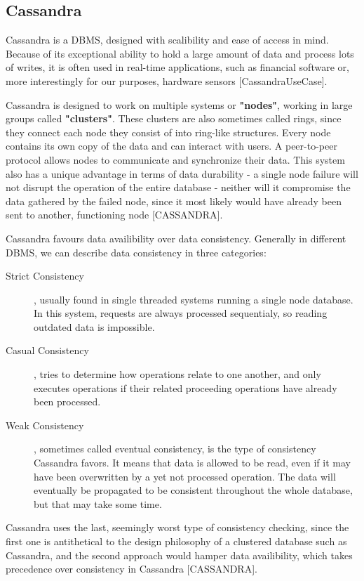 \subsection{Cassandra}
\label{subsec:background:second_section:first_subsection}
\par Cassandra is a DBMS, designed with scalibility and ease of access in mind. Because of its exceptional ability to hold a large amount of data and process lots of writes, it is often used in real-time applications, such as financial software or, more interestingly for our purposes, hardware sensors [CassandraUseCase]. 
\par Cassandra is designed to work on multiple systems or \textbf{"nodes"}, working in large groups called \textbf{"clusters"}. These clusters are also sometimes called rings, since they connect each node they consist of into ring-like structures. Every node contains its own copy of the data and can interact with users. A peer-to-peer protocol allows nodes to communicate and synchronize their data. This system also has a unique advantage in terms of data durability - a single node failure will not disrupt the operation of the entire database - neither will it compromise the data gathered by the failed node, since it most likely would have already been sent to another, functioning node [CASSANDRA].
\par Cassandra favours data availibility over data consistency. Generally in different DBMS, we can describe data consistency in three categories:
\begin{description}
  \item [Strict Consistency], usually found in single threaded systems running a single node database. In this system, requests are always processed sequentialy, so reading outdated data is impossible.
  \item [Casual Consistency], tries to determine how operations relate to one another, and only executes operations if their related proceeding operations have already been processed.
  \item [Weak Consistency], sometimes called eventual consistency, is the type of consistency Cassandra favors. It means that data is allowed to be read, even if it may have been overwritten by a yet not processed operation. The data will eventually be propagated to be consistent throughout the whole database, but that may take some time.
\end{description}
\par Cassandra uses the last, seemingly worst type of consistency checking, since the first one is antithetical to the design philosophy of a clustered database such as Cassandra, and the second approach would hamper data availibility, which takes precedence over consistency in Cassandra [CASSANDRA].
